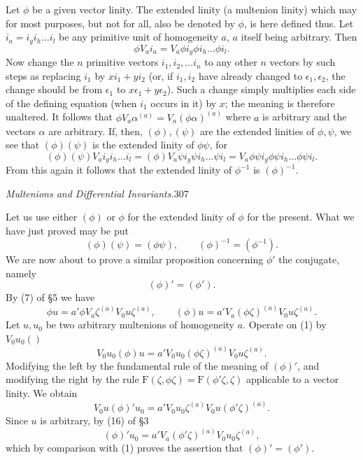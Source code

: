 \documentclass[11pt]{article}
\begin{document}
\indent Let $\phi$ be a given vector linity. The extended linity (a multenion linity) which may for most purposes, but not for all, also be denoted by $\phi$, is here defined thus. Let $i_a=i_gi_h\ldots i_l$ be any primitive unit of homogeneity $a$, $a$ itself being arbitrary. Then
\[\phi V_ai_a=V_a\phi i_g\phi i_h\ldots\phi i_l.\]
Now change the $n$ primitive vectors $i_1,i_2,\ldots i_n$ to any other $n$ vectors by such steps as replacing $i_1$ by $xi_1+yi_2$ (or, if $i_1,i_2$ have already changed to $\epsilon_1,\epsilon_2$, the change should be from $\epsilon_1$ to $x\epsilon_1+y\epsilon_2$). Such a change simply multiplies each side of the defining equation (when $i_1$ occurs in it) by $x$; the meaning is therefore unaltered. It follows that $\phi V_a\alpha^{(a)}=V_a(\phi\alpha)^{(a)}$ where $a$ is arbitrary and the vectors $\alpha$ are arbitrary. If, then, $(\phi),(\psi)$ are the extended linities of $\phi,\psi$, we see that $(\phi)(\psi)$ is the extended linity of $\phi\psi$, for
\[(\phi)(\psi)V_ai_gi_h\ldots i_l=(\phi)V_a\psi i_g\psi i_h\ldots\psi i_l=V_a\phi\psi i_g\phi\psi i_h\ldots\phi\psi i_l.\]
From this again it follows that the extended linity of $\phi^{-1}$ is $(\phi)^{-1}$.

\newpage\thispagestyle{empty}\begin{center}\textit{Multenions and Differential Invariants.}\hfill 307\end{center}
Let us use either $(\phi)$ or $\phi$ for the extended linity of $\phi$ for the present. What we have just proved may be put
\[(\phi)(\psi)=(\phi\psi),\qquad (\phi)^{-1}=(\phi^{-1}).\]
We are now about to prove a similar proposition concerning $\phi'$ the conjugate, namely
\[(\phi)'=(\phi').\]
By (7) of §5 we have
\begin{equation}\phi u=a'\phi V_a\zeta^{(a)}V_0u\zeta^{(a)},\qquad (\phi)u=a'V_a(\phi\zeta)^{(a)}V_0u\zeta^{(a)}.\tag{1}\end{equation}
Let $u,u_0$ be two arbitrary multenions of homogeneity $a$. Operate on (1) by $V_0u_0()$
\[V_0u_0(\phi)u=a'V_0u_0(\phi\zeta)^{(a)}V_0u\zeta^{(a)}.\]
Modifying the left by the fundamental rule of the meaning of $(\phi)'$, and modifying the right by the rule $\mathrm F(\zeta,\phi\zeta)=\mathrm F(\phi'\zeta,\zeta)$ applicable to a vector linity. We obtain
\[V_0u(\phi)'u_0=a'V_0u_0\zeta^{(a)}V_0u(\phi'\zeta)^{(a)}.\]
Since $u$ is arbitrary, by (16) of §3
\[(\phi)'u_0=a'V_a(\phi'\zeta)^{(a)}V_0u_0\zeta^{(a)},\]
which by comparison with (1) proves the assertion that $(\phi)'=(\phi')$.
\end{document}
